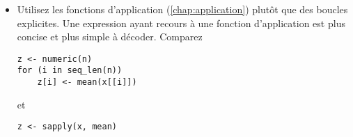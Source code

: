\begin{itemize}
  d'un point de vue logique
  \begin{Schunk}
\begin{Verbatim}
if (!all(!is.na(x)))
\end{Verbatim}
  \end{Schunk}
  En revanche, s'il s'agit plutôt d'exécuter une expression quand un
  vecteur ne contient aucune donnée manquante, alors
  \begin{Schunk}
\begin{Verbatim}
if (all(!is.na(x)))
\end{Verbatim}
  \end{Schunk}
  est plus simple que
  \begin{Schunk}
\begin{Verbatim}
if (!any(is.na(x)))
\end{Verbatim}
  \end{Schunk}

  De plus, le conseil précédent sur la priorité des opérations est
  particulièrement indiqué avec les opérations logiques. Sauriez-vous
  confirmer, sans consulter le \autoref{tab:bases:operateurs}, l'ordre
  des opérations dans l'expression logique suivante?\footnote{%
    C'est .}
  \begin{Schunk}
\begin{Verbatim}
!p | q & r
\end{Verbatim}
  \end{Schunk}
\item Utilisez les fonctions d'application
  (\autoref{chap:application}) plutôt que des boucles explicites. Une
  expression ayant recours à une fonction d'application est plus
  concise et plus simple à décoder. Comparez
  \begin{Schunk}
\begin{Verbatim}
z <- numeric(n)
for (i in seq_len(n))
    z[i] <- mean(x[[i]])
\end{Verbatim}
  \end{Schunk}
  et
  \begin{Schunk}
\begin{Verbatim}
z <- sapply(x, mean)
\end{Verbatim}
  \end{Schunk}


\end{itemize}
